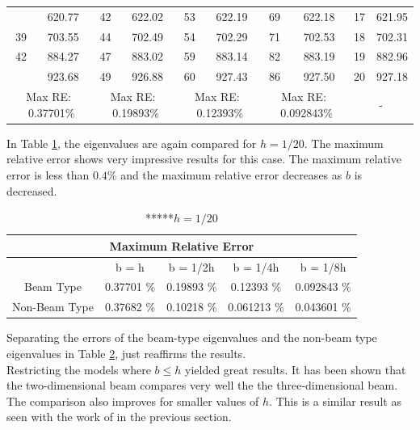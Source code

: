 \documentclass[../../main.tex]{subfiles}
\begin{document}
\begin{table}[ht]
{{\begin{tabular}{|cc|cc|cc|cc||cc|}
		\rowcolor{lightgray}{37} & 620.77 & {42} & 622.02 & {53} & 622.19 & {69} & 622.18 & {17} & {621.95} \\
		{39} & 703.55 & {44} & 702.49 & {54} & 702.29 & {71} & 702.53 & {18} & {702.31} \\
		{42} & 884.27 & {47} & 883.02 & {59} & 883.14 & {82} & 883.19 & {19} & {882.96} \\
		\rowcolor{lightgray}{44} & 923.68 & {49} & 926.88 & {60} & 927.43 & {86} & 927.50 & {20} & {927.18} \\
		\hline
		\hline
		\multicolumn{2}{|c|}{Max RE: \  0.37701\%} &\multicolumn{2}{c|}{Max RE: \ 0.19893\%}  & \multicolumn{2}{c|}{Max RE: \  0.12393\%}  & \multicolumn{2}{c||}{Max RE: \ 0.092843\%}& \multicolumn{2}{c|}{-} \\
		\hline
	\end{tabular}%
	\label{tab:2v3_2}%
}}
\end{table}%
\FloatBarrier

In Table \ref{tab:2v3_2}, the eigenvalues are again compared for $h = 1/20$. The maximum relative error shows very impressive results for this case. The maximum relative error is less than $0.4\%$ and the maximum relative error decreases as $b$ is decreased.\\

\begin{table}[htbp]
	\centering
	\caption{*****$h = 1/20$}
	\begin{tabular}{|c|cccc|}
		\hline
		\multicolumn{5}{|c|}{Maximum Relative Error} \\
		\hline
		\hline
		& {b = h} & {b = 1/2h} & {b = 1/4h} & {b = 1/8h} \\
		\hline
		Beam Type & 0.37701 \% & 0.19893 \% & 0.12393 \% & 0.092843 \% \\
		Non-Beam Type & 0.37682 \% & 0.10218 \% & 0.061213 \% & 0.043601 \% \\
		\hline
	\end{tabular}%
	\label{tab:2v3_2_split}%
\end{table}%
\FloatBarrier

Separating the errors of the beam-type eigenvalues and the non-beam type eigenvalues in Table \ref{tab:2v3_2_split}, just reaffirms the results.\\

Restricting the models where $b \leq h$ yielded great results. It has been shown that the two-dimensional beam compares very well the the three-dimensional beam. The comparison also improves for smaller values of $h$. This is a similar result as seen with the work of \cite{LVV09} in the previous section.
\end{document}
